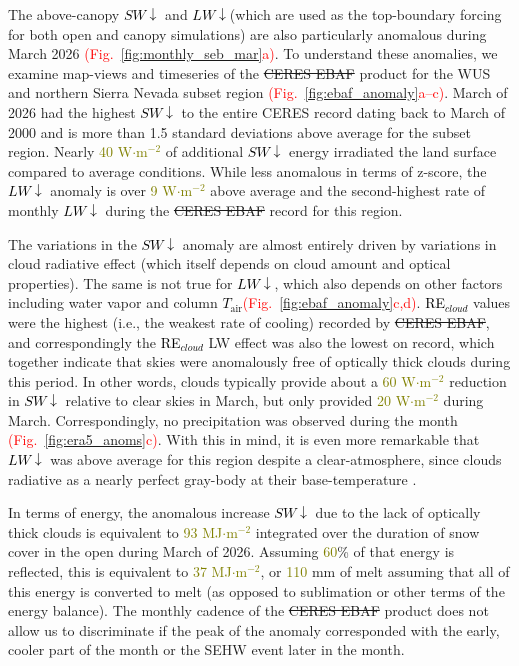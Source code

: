 \documentclass[draft]{agujournal2019}
\newcommand{\fig}[2]{\textcolor{red}{(Fig.~\ref{#1}{#2})}}   %
\newcommand{\mynum}[1]{\textcolor{olive}{#1}}
\newcommand{\tair}{\textcolor{black}{$T_{\mathrm{air}}$}\xspace}
\newcommand{\lwdn}{\textcolor{black}{$LW\downarrow$}\xspace}
\newcommand{\swdn}{\textcolor{black}{$SW\downarrow$}\xspace}
\newcommand{\rfcirrus}{\textcolor{black}{RE$_{cloud}$}\xspace}
\newcommand{\wmsq}{\textcolor{olive}{W$\cdot$m$^{-2}$}\xspace}
\newcommand{\mjmtwo}{\textcolor{olive}{MJ$\cdot$m$^{-2}$}\xspace}
\providecommand{\DIFadd}[1]{{\protect\color{blue}\uwave{#1}}} %
\providecommand{\DIFdel}[1]{{\protect\color{red}\sout{#1}}}                      %
\providecommand{\DIFaddbegin}{} %
\providecommand{\DIFaddend}{} %
\providecommand{\DIFdelbegin}{} %
\providecommand{\DIFdelend}{} %
\begin{document}
The above-canopy \swdn and \lwdn (which are used as the top-boundary forcing for both open and canopy simulations) are also particularly anomalous during March 2026 \fig{fig:monthly_seb_mar}{a}.
To understand these anomalies, we examine map-views and timeseries of the \DIFdelbegin \DIFdel{CERES EBAF }\DIFdelend \DIFaddbegin \DIFadd{CERES-EBAF }\DIFaddend product for the WUS and northern Sierra Nevada subset region \fig{fig:ebaf_anomaly}{a--c}.
March of 2026 had the highest \swdn to the entire CERES record dating back to March of 2000 and is more than 1.5 standard deviations above average for the subset region.
Nearly \mynum{40} \wmsq of additional \swdn energy irradiated the land surface compared to average conditions.
While less anomalous in terms of z-score, the \lwdn anomaly is over \mynum{9} \wmsq above average and the second-highest rate of monthly \lwdn during the \DIFdelbegin \DIFdel{CERES EBAF }\DIFdelend \DIFaddbegin \DIFadd{CERES-EBAF }\DIFaddend record for this region.

The variations in the \swdn anomaly are almost entirely driven by variations in cloud radiative effect (which itself depends on cloud amount and optical properties).
The same is not true for \lwdn, which also depends on other factors including water vapor and column \tair \fig{fig:ebaf_anomaly}{c,d}.
\rfcirrus values were the highest (i.e., the weakest rate of cooling) recorded by \DIFdelbegin \DIFdel{CERES EBAF}\DIFdelend \DIFaddbegin \DIFadd{CERES-EBAF}\DIFaddend , and correspondingly the \rfcirrus LW effect was also the lowest on record, which together indicate that skies were anomalously free of optically thick clouds during this period.
In other words, clouds typically provide about a \mynum{60} \wmsq reduction in \swdn relative to clear skies in March, but only provided \mynum{20} \wmsq during March. 
Correspondingly, no precipitation was observed during the month \fig{fig:era5_anoms}{c}.
With this in mind, it is even more remarkable that \lwdn was above average for this region despite a clear-atmosphere, since clouds radiative as a nearly perfect gray-body at their base-temperature \cite{Shupe2004-kl}.


In terms of energy, the anomalous increase \swdn due to the lack of optically thick clouds is equivalent to \mynum{93} \mjmtwo integrated over the duration of snow cover in the open during March of 2026. 
Assuming \mynum{60}\% of that energy is reflected, this is equivalent to \mynum{37} \mjmtwo, or \mynum{110} mm of melt assuming that all of this energy is converted to melt (as opposed to sublimation or other terms of the energy balance).
The monthly cadence of the \DIFdelbegin \DIFdel{CERES EBAF }\DIFdelend \DIFaddbegin \DIFadd{CERES-EBAF }\DIFaddend product does not allow us to discriminate if the peak of the anomaly corresponded with the early, cooler part of the month or the SEHW event later in the month.
\end{document}
